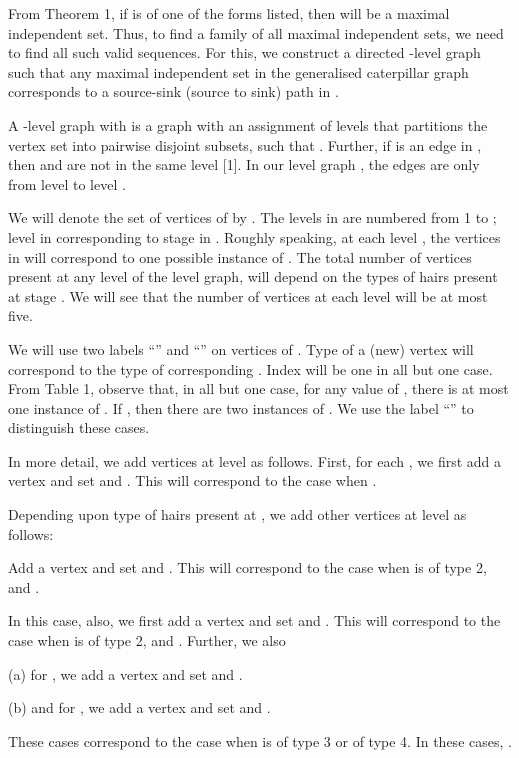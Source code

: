 \documentclass[10pt]{article}
\begin{document}
From Theorem 1, if  is of one of the forms listed, then
 will be a maximal independent set. Thus, to
find a family of all maximal independent sets, we need to find all such
valid sequences. For this, we construct a directed -level graph 
such that any maximal independent set in the generalised caterpillar
graph corresponds to a source-sink (source to sink) path in . 

A -level graph  with  is a graph with an
assignment of levels  that
partitions the vertex set into  pairwise disjoint subsets,  such that . Further, if  is
an edge in , then  and  are not in the same level [1]. In our
level graph , the edges are only from level  to level .

We will denote the set of vertices of  by .  The  levels in
 are numbered from 1 to ; level  in  corresponding to
stage  in .  Roughly speaking, at each level , the
vertices in  will correspond to one possible instance of .  The
total number of vertices present at any level  of the level graph,
will depend on the types of hairs present at stage . We will see that 
the number of vertices at each level will be at most five.

We will use two labels ``'' and ``'' on vertices of .
Type of a (new) vertex will correspond to the type of corresponding
. Index will be one in all but one case. From Table 1, observe that,
in all but one case, for any value of , there is at most one
instance of . If , then there are two instances of . We
use the label ``'' to distinguish these cases.


In more detail, we add vertices at level  as follows. First, for each
, we first add a vertex  and set  and
. This will correspond to the case when .

Depending upon type of hairs present at , we add other vertices at
level  as follows: 


 Add a vertex  and set
 and . This will correspond to the case when
 is of type 2, and .

 In this case, also, we
first add a vertex  and set  and . This
will correspond to the case when  is of type 2, and .  
Further, we also 

\noindent (a) for , we add a vertex  and set  and
.
  
\noindent (b) and for , we add a vertex  and set  and
.  

These cases correspond to the case when  is of type 3 or of type 4.
In these cases, . 
\end{document}
